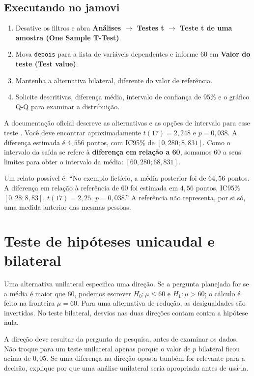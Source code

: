 \subsection{Executando no jamovi}

\begin{enumerate}
  \item Desative os filtros e abra \textbf{Análises $\rightarrow$ Testes t $\rightarrow$ Teste t de uma amostra (One Sample T-Test)}.
  \item Mova \texttt{depois} para a lista de variáveis dependentes e informe $60$ em \textbf{Valor do teste (Test value)}.
  \item Mantenha a alternativa bilateral, diferente do valor de referência.
  \item Solicite descritivas, diferença média, intervalo de confiança de 95\% e o gráfico Q-Q para examinar a distribuição.
\end{enumerate}

A documentação oficial descreve as alternativas e as opções de intervalo para esse teste \parencite{JamoviTUmaAmostra}. Você deve encontrar aproximadamente $t(17)=2{,}248$ e $p=0{,}038$. A diferença estimada é $4{,}556$ pontos, com IC95\% de $[0{,}280;8{,}831]$. Como o intervalo da saída se refere à \textbf{diferença em relação a 60}, somamos $60$ a seus limites para obter o intervalo da média: $[60{,}280;68{,}831]$.

Um relato possível é: ``No exemplo fictício, a média posterior foi de $64{,}56$ pontos. A diferença em relação à referência de $60$ foi estimada em $4{,}56$ pontos, IC95\% $[0{,}28;8{,}83]$, $t(17)=2{,}25$, $p=0{,}038$.'' A referência não representa, por si só, uma medida anterior das mesmas pessoas.

\section{Teste de hipóteses unicaudal e bilateral}

Uma alternativa unilateral especifica uma direção. Se a pergunta planejada for se a média é maior que $60$, podemos escrever $H_0:\mu\leq60$ e $H_1:\mu>60$; o cálculo é feito na fronteira $\mu=60$. Para uma alternativa de redução, as desigualdades são invertidas. No teste bilateral, desvios nas duas direções contam contra a hipótese nula.

A direção deve resultar da pergunta de pesquisa, antes de examinar os dados. Não troque para um teste unilateral apenas porque o valor de $p$ bilateral ficou acima de $0{,}05$. Se uma diferença na direção oposta também for relevante para a decisão, explique por que uma análise unilateral seria apropriada antes de usá-la.

